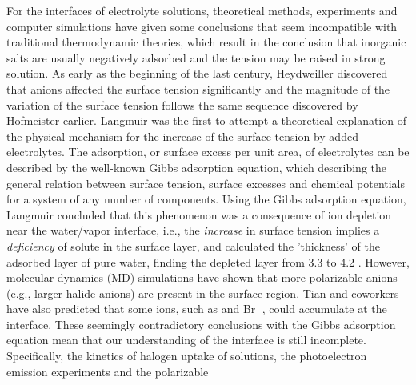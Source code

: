 For the interfaces of electrolyte solutions, theoretical methods, experiments and computer simulations have given some conclusions that seem incompatible with traditional thermodynamic theories, which result in the conclusion that inorganic salts are usually negatively adsorbed and the tension may
be raised in strong solution\cite{Gibbs1928, Adam1941}.
As early as the beginning of the last century, Heydweiller discovered that anions affected the surface tension significantly
and the magnitude of the variation of the surface tension follows the same sequence discovered by Hofmeister earlier\cite{dosSantos10}.
Langmuir\cite{Langmuir1917} was the first to attempt a theoretical explanation of the physical mechanism for the increase of the surface tension by added electrolytes.
The adsorption, or surface excess per unit area, of electrolytes can be described by the well-known Gibbs adsorption equation, which describing the general relation between
surface tension, surface excesses and chemical potentials for a system of any number of components.
Using the Gibbs adsorption equation, Langmuir concluded that this phenomenon was a consequence of ion depletion 
near the water/vapor interface, i.e., the \emph{increase} in surface tension 
implies a \emph{deficiency} of solute in the surface layer\cite{Jarvis1968}, and
calculated the 'thickness' of the adsorbed layer of pure water, finding 
the depleted layer from 3.3 to 4.2 \A. 
%
However, molecular dynamics (MD) simulations have shown that more polarizable anions (e.g., larger halide anions) 
are present in the surface region\cite{Jungwirth2001,Jungwirth2002}. 
Tian and coworkers\cite{CST11} have also predicted that some ions, such as \I and Br$^{-}$, could accumulate at the interface.
These seemingly contradictory conclusions with the Gibbs adsorption equation mean that our understanding of the interface is still incomplete. 
Specifically, the kinetics of halogen uptake of solutions\cite{HuJH95}, the photoelectron emission experiments\cite{Markovich1991,Ghosal05,Garrett04} and the polarizable 
